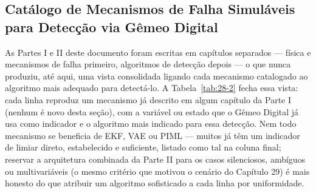 \documentclass[12pt,a4paper]{article}
\numberwithin{equation}{section}
\numberwithin{table}{section}
\numberwithin{figure}{section}
\begin{document}
\subsection{Catálogo de Mecanismos de Falha Simuláveis para Detecção via Gêmeo Digital}

As Partes I e II deste documento foram escritas em capítulos separados — física e mecanismos de falha primeiro, algoritmos de detecção depois — o que nunca produziu, até aqui, uma vista consolidada ligando cada mecanismo catalogado ao algoritmo mais adequado para detectá-lo. A Tabela~\ref{tab:28-2} fecha essa vista: cada linha reproduz um mecanismo já descrito em algum capítulo da Parte I (nenhum é novo desta seção), com a variável ou estado que o Gêmeo Digital já usa como indicador e o algoritmo mais indicado para essa detecção. Nem todo mecanismo se beneficia de EKF, VAE ou PIML — muitos já têm um indicador de limiar direto, estabelecido e suficiente, listado como tal na coluna final; reservar a arquitetura combinada da Parte II para os casos silenciosos, ambíguos ou multivariáveis (o mesmo critério que motivou o cenário do Capítulo 29) é mais honesto do que atribuir um algoritmo sofisticado a cada linha por uniformidade.
\end{document}
